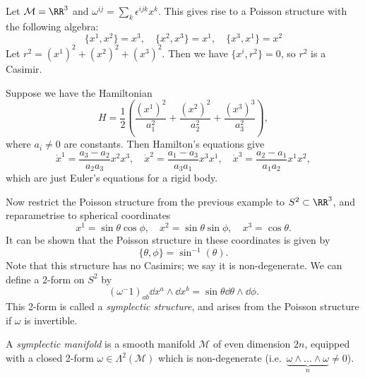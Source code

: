 \documentclass{jknotes}
\begin{document}
\begin{eg}
    Let \(\mathcal{M}=\RR^3\) and \(\omega^{ij} = \sum_k \epsilon^{ijk} x^k\). This gives rise to a Poisson structure with the following algebra:
    \begin{equation}
        \{x^1,x^2\} = x^3,\quad \{x^2,x^3\} = x^1,\quad \{x^3,x^1\} = x^2
    \end{equation}
    Let \(r^2 = (x^1)^2+(x^2)^2+(x^3)^2\). Then we have \(\{x^i,r^2\}=0\), so \(r^2\) is a Casimir. 

    Suppose we have the Hamiltonian 
    \begin{equation}
        H = \frac{1}{2}\left(\frac{(x^1)^2}{a_1^2} + \frac{(x^2)^2}{a_2^2} + \frac{(x^3)^3}{a_3^2}\right),
    \end{equation}
    where \(a_i\ne0\) are constants. Then Hamilton's equations give
    \begin{equation}
        \dot{x}^1 = \frac{a_3-a_2}{a_2a_3}x^2x^3,\quad
        \dot{x}^2 = \frac{a_1-a_3}{a_3a_1}x^3x^1,\quad
        \dot{x}^3 = \frac{a_2-a_1}{a_1a_2}x^1x^2,
    \end{equation}
    which are just Euler's equations for a rigid body.
\end{eg}
\begin{eg}
    Now restrict the Poisson structure from the previous example to \(S^2\subset\RR^3\), and reparametrise to spherical coordinates
    \begin{equation}
        x^1=\sin\theta\cos\phi,\quad x^2=\sin\theta\sin\phi,\quad x^3=\cos\theta.
    \end{equation}
    It can be shown that the Poisson structure in these coordinates is given by
    \begin{equation}
        \{\theta,\phi\}=\sin^{-1}(\theta).
    \end{equation}
    Note that this structure has no Casimirs; we say it is non-degenerate. We can define a 2-form on \(S^2\) by
    \begin{equation}
        (\omega^-1)_{ab}\dd{x^a}\wedge\dd{x^b}=\sin\theta\dd{\theta}\wedge\dd{\phi}.
    \end{equation}
    This 2-form is called a \emph{symplectic structure}, and arises from the Poisson structure if \(\omega\) is invertible.
\end{eg}

\begin{defn}
    A \emph{symplectic manifold} is a smooth manifold \(\mathcal{M}\) of even dimension \(2n\), equipped with a closed 2-form \(\omega\in\Lambda^2(\mathcal{M})\) which is non-degenerate (i.e.\ \(\underbrace{\omega\wedge\dots\wedge\omega}_n \ne 0\)).
\end{defn}
\end{document}

